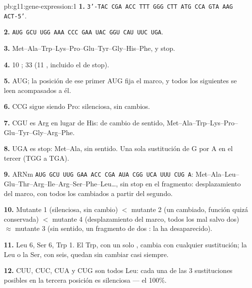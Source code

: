 \begin{solution}{pb:g11:gene-expression:1}
\textbf{1.} \texttt{3'-TAC CGA ACC TTT GGG CTT ATG CCA GTA AAG ACT-5'}.

\textbf{2.} \texttt{AUG GCU UGG AAA CCC GAA UAC GGU CAU UUC UGA}.

\textbf{3.} Met--Ala--Trp--Lys--Pro--Glu--Tyr--Gly--His--Phe, y stop.

\textbf{4.} 10 ; 33  (11 , incluido el de
stop).

\textbf{5.} AUG; la posición de ese primer AUG fija el marco, y todos
los  siguientes se leen acompasados a él.

\textbf{6.} CCG sigue siendo Pro: silenciosa,  sin cambios.

\textbf{7.} CGU es Arg en lugar de His: de cambio de sentido,
Met--Ala--Trp--Lys--Pro--Glu--Tyr--Gly--Arg--Phe.

\textbf{8.} UGA es stop: Met--Ala, sin sentido. Una sola sustitución de
G por A en el tercer  (TGG a TGA).

\textbf{9.} ARNm \texttt{AUG GCU UUG GAA ACC CGA AUA CGG UCA UUU CUG
A}: Met--Ala--Leu--Glu--Thr--Arg--Ile--Arg--Ser--Phe--Leu\dots, sin
stop en el fragmento: desplazamiento del marco, con todos los
 cambiados a partir del segundo.

\textbf{10.} Mutante 1 (silenciosa, sin cambio) $<$ mutante 2 (un
 cambiado, función quizá conservada) $<$ mutante 4
(desplazamiento del marco, todos los  mal salvo dos)
$\approx$ mutante 3 (sin sentido, un fragmento de dos : la
 ha desaparecido).

\textbf{11.} Leu 6, Ser 6, Trp 1. El Trp, con un solo , cambia con
cualquier sustitución; la Leu o la Ser, con seis, quedan sin cambiar
casi siempre.

\textbf{12.} CUU, CUC, CUA y CUG son todos Leu: cada una de las 3
sustituciones posibles en la tercera posición es silenciosa --- el
100\%.


\end{solution}
